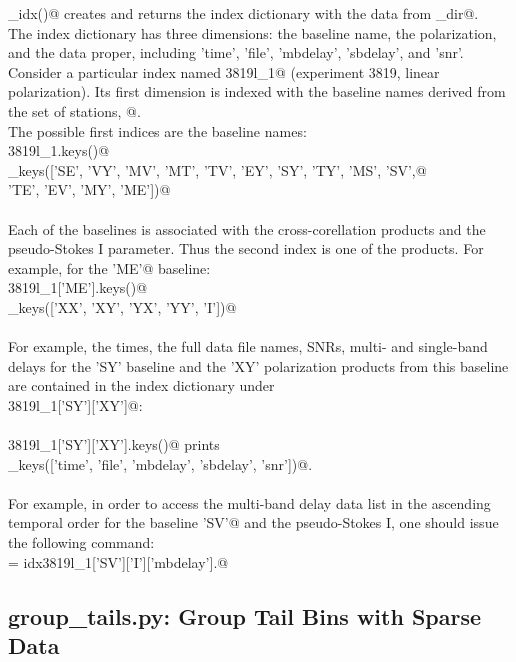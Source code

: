 \documentclass[letterpaper,twoside,12pt]{article}
\begin{document}
\noindent \verb@make_idx()@ creates and returns the index dictionary with the data from \verb@base_dir@. \\

The index dictionary has three dimensions: the baseline name, the polarization, and the data proper, including 'time', 'file', 'mbdelay', 'sbdelay', and 'snr'. Consider a particular index named \verb@idx3819l_1@ (experiment 3819, linear polarization). Its first dimension is indexed with the baseline names derived from the set of stations, @. \\
\noindent The possible first indices are the baseline names: \\
\verb@idx3819l_1.keys()@ \\
\verb@dict_keys(['SE', 'VY', 'MV', 'MT', 'TV', 'EY', 'SY', 'TY', 'MS', 'SV',@ \\
\verb@           'TE', 'EV', 'MY', 'ME'])@ \\ \\
\noindent Each of the baselines is associated with the cross-corellation products and the pseudo-Stokes I parameter. Thus the second index is one of the products. For example, for the \verb@'ME'@ baseline: \\
\verb@idx3819l_1['ME'].keys()@ \\
\verb@dict_keys(['XX', 'XY', 'YX', 'YY', 'I'])@ \\ \\
For example, the times, the full data file names, SNRs, multi- and single-band delays for the 'SY' baseline and the 'XY' polarization products from this baseline are contained in the index dictionary under \\
\verb@idx3819l_1['SY']['XY']@: \\ \\
\verb@idx3819l_1['SY']['XY'].keys()@ prints \\
\verb@dict_keys(['time', 'file', 'mbdelay', 'sbdelay', 'snr'])@. \\ \\
For example, in order to access the multi-band delay data list in the ascending temporal order for the baseline \verb@'SV'@ and the pseudo-Stokes I, one should issue the following command: \\
\verb@mbd = idx3819l_1['SV']['I']['mbdelay'].@

\subsection{group\_tails.py: Group Tail Bins with Sparse Data}
\end{document}
